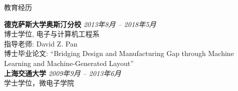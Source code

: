 

\begin{rSection}{教育经历}


{\bf 德克萨斯大学奥斯汀分校} \hfill {\em 2013年8月 -- 2018年5月} \\ 
博士学位, 电子与计算机工程系 \\
指导老师: David Z. Pan \\
博士毕业论文: ``Bridging Design and Manufacturing Gap through Machine Learning and Machine-Generated Layout'' \\

{\bf 上海交通大学} \hfill {\em 2009年9月 -- 2013年6月} \\ 
学士学位，微电子学院 \\

\end{rSection}

